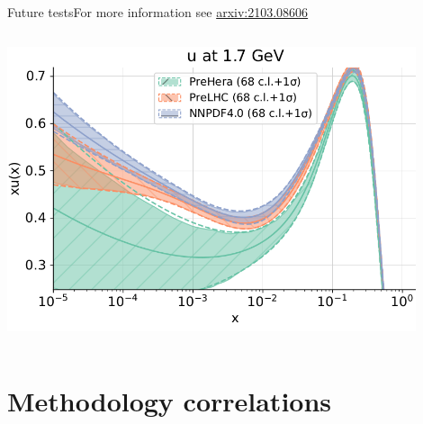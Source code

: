 \documentclass[aspectratio=169,10pt]{beamer}
\begin{document}
\begin{frame}[t]{Future tests}{For more information see \href{https://arxiv.org/pdf/2103.08606.pdf}{\color{blue} arxiv:2103.08606}}
\begin{columns}
        \includegraphics[width=0.9\textwidth]{future_test/diffu}
    \end{columns}
\end{frame}



\section{Methodology correlations}
\end{document}
